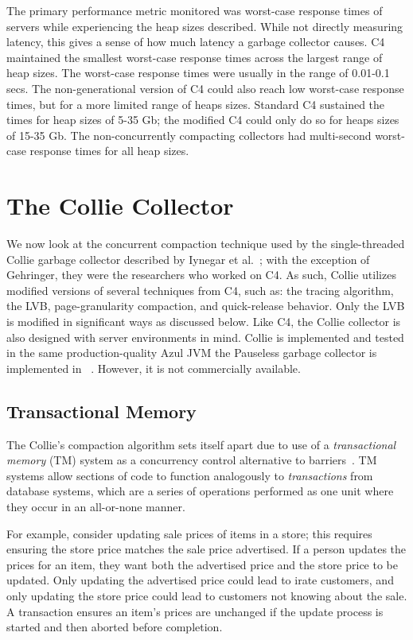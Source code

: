 \documentclass{sig-alternate}
\begin{document}
The primary performance metric monitored was worst-case response times
of servers while experiencing the heap sizes
described. While not directly measuring latency, this gives a sense of how 
much latency a garbage collector causes. 
C4 maintained the smallest 
worst-case response times across the largest range of heap sizes.
The worst-case response times were usually in the range of 0.01-0.1 secs. 
The non-generational version of C4 could also reach low worst-case response times,
but for a more limited range of heaps sizes. Standard
C4 sustained the times for heap sizes of 5-35 Gb; the modified C4 could
only do so for heaps sizes of 15-35 Gb. The non-concurrently compacting
collectors had multi-second worst-case response times for all heap sizes.


\section{The Collie Collector}
\label{sec:collie}

We now look at the concurrent compaction technique used by the single-threaded
Collie garbage collector described by Iynegar et al.~\cite{Iyengar:Collie};
with the exception of Gehringer, they were the researchers who worked on C4.
As such, Collie utilizes modified versions of several techniques from C4, such as:
the tracing algorithm, the LVB, page-granularity compaction, and quick-release behavior.
Only the LVB is modified in significant ways as discussed below.
Like C4, the Collie
collector is also designed with server environments in mind. 
Collie is implemented and tested in 
the same production-quality Azul JVM the Pauseless garbage collector is implemented in
~\cite{Click:Pauseless}. However, it is not commercially available.


\subsection{Transactional Memory}
\label{sec:collieTM}

The Collie's compaction algorithm sets itself apart due to use 
of a \emph{transactional memory} (TM) system as a concurrency control 
alternative to barriers~\cite{Iyengar:Collie}. TM systems allow
sections of code to function 
analogously to \emph{transactions} from database systems, 
which are a series of operations performed as one unit where 
they occur in an all-or-none manner.

For example, consider updating sale prices of items in a store; this requires
ensuring the store price matches the sale price advertised. 
If a person updates the prices for an item, they want both the
advertised price and the store price to be updated. Only updating the
advertised price could lead to irate customers, and only updating the
store price could lead to customers not knowing about the sale. A transaction
ensures an item's prices are unchanged if the update process 
is started and then aborted before completion.
\end{document}

